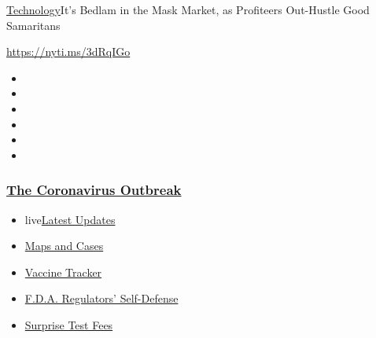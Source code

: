 \href{/section/technology}{Technology}\textbar{}It's Bedlam in the Mask
Market, as Profiteers Out-Hustle Good Samaritans

\url{https://nyti.ms/3dRqIGo}

\begin{itemize}
\item
\item
\item
\item
\item
\item
\end{itemize}

\hypertarget{the-coronavirus-outbreak}{%
\subsubsection{\texorpdfstring{\href{https://www.nytimes3xbfgragh.onion/news-event/coronavirus?name=styln-coronavirus-markets\&region=TOP_BANNER\&block=storyline_menu_recirc\&action=click\&pgtype=Article\&impression_id=7ea2d870-f4b9-11ea-a9ee-334f178d1f9e\&variant=undefined}{The
Coronavirus
Outbreak}}{The Coronavirus Outbreak}}\label{the-coronavirus-outbreak}}

\begin{itemize}
\tightlist
\item
  live\href{https://www.nytimes3xbfgragh.onion/2020/09/11/world/covid-19-coronavirus.html?name=styln-coronavirus-markets\&region=TOP_BANNER\&block=storyline_menu_recirc\&action=click\&pgtype=Article\&impression_id=7ea2d871-f4b9-11ea-a9ee-334f178d1f9e\&variant=undefined}{Latest
  Updates}
\item
  \href{https://www.nytimes3xbfgragh.onion/interactive/2020/us/coronavirus-us-cases.html?name=styln-coronavirus-markets\&region=TOP_BANNER\&block=storyline_menu_recirc\&action=click\&pgtype=Article\&impression_id=7ea2ff80-f4b9-11ea-a9ee-334f178d1f9e\&variant=undefined}{Maps
  and Cases}
\item
  \href{https://www.nytimes3xbfgragh.onion/interactive/2020/science/coronavirus-vaccine-tracker.html?name=styln-coronavirus-markets\&region=TOP_BANNER\&block=storyline_menu_recirc\&action=click\&pgtype=Article\&impression_id=7ea2ff81-f4b9-11ea-a9ee-334f178d1f9e\&variant=undefined}{Vaccine
  Tracker}
\item
  \href{https://www.nytimes3xbfgragh.onion/2020/09/10/us/politics/fda-coronavirus-vaccine.html?name=styln-coronavirus-markets\&region=TOP_BANNER\&block=storyline_menu_recirc\&action=click\&pgtype=Article\&impression_id=7ea2ff82-f4b9-11ea-a9ee-334f178d1f9e\&variant=undefined}{F.D.A.
  Regulators' Self-Defense}
\item
  \href{https://www.nytimes3xbfgragh.onion/2020/09/09/upshot/coronavirus-surprise-test-fees.html?name=styln-coronavirus-markets\&region=TOP_BANNER\&block=storyline_menu_recirc\&action=click\&pgtype=Article\&impression_id=7ea2ff83-f4b9-11ea-a9ee-334f178d1f9e\&variant=undefined}{Surprise
  Test Fees}
\end{itemize}

